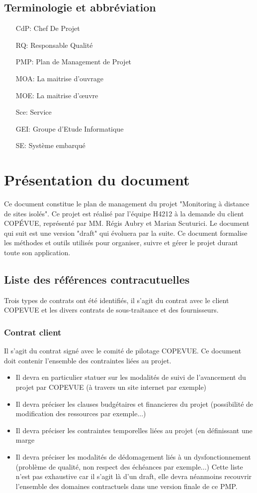 \subsection{Terminologie et abbréviation}
\begin{itemize}
\item [CdP: ]Chef De Projet
\item [RQ: ]Responsable Qualité
\item [PMP: ]Plan de Management de Projet
\item [MOA: ]La maitrise d’ouvrage 
\item [MOE: ]La maitrise d’œuvre
\item [Sce: ]Service
\item [GEI: ]Groupe d'Etude Informatique
\item [SE: ]Système embarqué
\end{itemize}
\section{Présentation du document}

Ce document constitue le plan de management du projet "Monitoring à distance de sites isolés".
Ce projet est réalisé par l'équipe H4212 à la demande du client COPÉVUE, représenté par MM. Régis Aubry et Marian Scuturici.
Le document qui suit est une version "draft" qui évoluera par la suite.
Ce document formalise les méthodes et outils utilisés pour organiser, suivre et gérer le projet durant toute son application.

\subsection{Liste des références contracutuelles}
Trois types de contrats ont été identifiés, il s'agit du contrat avec le client COPEVUE et les divers contrats de sous-traitance et des fournisseurs.
\subsubsection{Contrat client}
Il s'agit du contrat signé avec le comité de pilotage COPEVUE. Ce document doit contenir l'ensemble des contraintes liées au projet. 
\begin{itemize}
\item Il devra en particulier statuer sur les modalités de suivi de l'avancement du projet par COPEVUE (à travers un site internet par exemple)
\item Il devra préciser les clauses budgétaires et financieres du projet (possibilité de modification des ressources par exemple...)
\item Il devra préciser les contraintes temporelles liées au projet (en définissant une marge
\item Il devra préciser les modalités de dédomagement liés à un dysfonctionnement (problème de qualité, non respect des échéances par exemple...)
Cette liste n'est pas exhaustive car il s'agit là d'un draft, elle devra néanmoins recouvrir l'ensemble des domaines contractuels dans une version finale de ce PMP.
\end{itemize}
